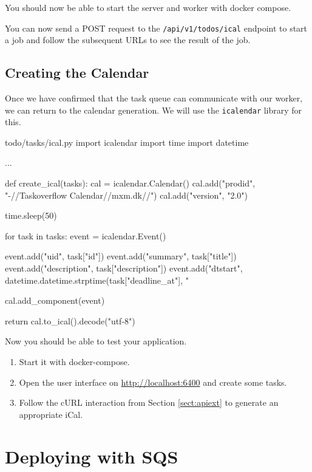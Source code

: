 \documentclass{csse4400}
\begin{document}
You should now be able to start the server and worker with docker compose.


You can now send a POST request to the \texttt{/api/v1/todos/ical} endpoint to start a job and follow the subsequent URLs to see the result of the job.

\subsection{Creating the Calendar}

Once we have confirmed that the task queue can communicate with our worker,
we can return to the calendar generation.
We will use the \texttt{icalendar} library for this.


\begin{code}[language=python,numbers=none]{todo/tasks/ical.py}
import icalendar
import time
import datetime

...

def create_ical(tasks):
    cal = icalendar.Calendar()
    cal.add("prodid", "-//Taskoverflow Calendar//mxm.dk//")
    cal.add("version", "2.0")

    time.sleep(50)

    for task in tasks:
        event = icalendar.Event()
        
        event.add("uid", task["id"])
        event.add("summary", task["title"])
        event.add("description", task["description"])
        event.add("dtstart", datetime.datetime.strptime(task["deadline_at"], "%

        cal.add_component(event)

    return cal.to_ical().decode("utf-8")
\end{code}

Now you should be able to test your application.
\begin{enumerate}
    \item Start it with docker-compose.
    \item Open the user interface on \url{http://localhost:6400} and create some tasks.
    \item Follow the cURL interaction from Section \ref{sect:apiext} to generate an appropriate iCal.
\end{enumerate}

\section{Deploying with SQS}
\end{document}
